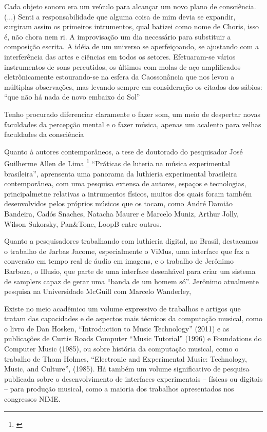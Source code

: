 Cada objeto sonoro era um veículo para alcançar um novo plano de consciência. (...) Senti a responsabilidade que alguma coisa de mim devia se expandir, surgiram assim os primeiros intrumentos, qual batizei como nome de Choris, isso é, não chora nem ri. A improvisação um dia necessário para substituir a composição escrita. A idéia de um universo se aperfeiçoando, se ajustando com a interferência das artes e ciências em todos os setores. Efetuaram-se vários instrumentos de sons percutidos, os últimos com molas de aço amplificados eletrônicamente estourando-se na esfera da Caossonância que nos levou a múltiplas observações, mas levando sempre em consideração os citados dos sábios: ``que não há nada de novo embaixo do Sol''

Tenho procurado diferenciar claramente o fazer som, um meio de despertar novas faculdades da percepção mental e o fazer música, apenas um acalento para velhas faculdades da consciência

Quanto à autores contemporâneos, a tese de doutorado do pesquisador José Guilherme Allen de Lima \footnote{\cite{Lima2018}} ``Práticas de luteria na música experimental brasileira'', aprensenta uma panorama da luthieria experimental brasileira contemporânea, com uma pesquisa extensa de autores, espaços e tecnologias, principalmetne relativas a intrumentos físicos, muitos dos quais foram também desenvolvidos pelos próprios músicos que os tocam, como André Damião Bandeira, Cadós Snaches, Natacha Maurer e Marcelo Muniz, Arthur Jolly, Wilson Sukorsky, Pan\&Tone, LoopB entre outros. 

Quanto a pesquisadores trabalhando com luthieria digital, no Brasil, destacamos o trabalho de Jarbas Jacome, especialmente o ViMus, uma interface que faz a conversão em tempo real de áudio em imagens, e o trabalho de Jerônimo Barboza, o Illusio, que parte de uma interface desenhável para criar um sistema de samplers capaz de gerar uma ``banda de um homem só''. Jerônimo atualmente pesquisa na Universidade McGuill com Marcelo Wanderley, 






Existe no meio acadêmico um volume expressivo de trabalhos e artigos que tratam das capacidades e de aspectos mais técnicos da computação musical, como o livro de Dan Hosken, ``Introduction to Music Technology'' (2011) e as publicações de Curtis Roads Computer ``Music Tutorial'' (1996) e Foundations do Computer Music (1985), ou sobre história da computação musical, como o trabalho de Thom Holmes, ``Electronic and Experimental Music: Technology, Music, and Culture'', (1985). Há também um volume significativo de pesquisa publicada sobre o desenvolvimento de interfaces experimentais – físicas ou digitais – para produção musical, como a maioria dos trabalhos apresentados nos congressos NIME. 


